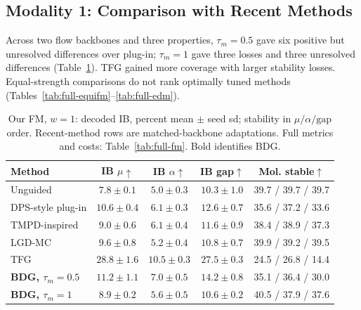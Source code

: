 \documentclass{article}
\begin{document}
\subsection{Modality 1: Comparison with Recent Methods}\label{sec:recent}
Across two flow backbones and three properties, $\tau_m=0.5$ gave six positive but unresolved differences over plug-in; $\tau_m=1$ gave three losses and three unresolved differences (Table~\ref{tab:recent}). TFG gained more coverage with larger stability losses. Equal-strength comparisons do not rank optimally tuned methods (Tables~\ref{tab:full-equifm}--\ref{tab:full-edm}).
\begin{table}[!htbp]
\centering\small
\caption{Our FM, $w=1$: decoded IB, percent mean $\pm$ seed sd; stability in $\mu/\alpha/\mathrm{gap}$ order. Recent-method rows are matched-backbone adaptations. Full metrics and costs: Table~\ref{tab:full-fm}. Bold identifies BDG.}
\label{tab:recent}
\begin{tabular}{lcccc}
\toprule
Method & IB $\mu\uparrow$ & IB $\alpha\uparrow$ & IB gap$\uparrow$ & Mol. stable$\uparrow$\\
\midrule
Unguided & $7.8\pm0.1$ & $5.0\pm0.3$ & $10.3\pm1.0$ & 39.7 / 39.7 / 39.7\\
DPS-style plug-in & $10.6\pm0.4$ & $6.1\pm0.3$ & $12.6\pm0.7$ & 35.6 / 37.2 / 33.6\\
TMPD-inspired & $9.0\pm0.6$ & $6.1\pm0.4$ & $11.6\pm0.9$ & 38.4 / 38.9 / 37.3\\
LGD-MC & $9.6\pm0.8$ & $5.2\pm0.4$ & $10.8\pm0.7$ & 39.9 / 39.2 / 39.5\\
TFG & $28.8\pm1.6$ & $10.5\pm0.3$ & $27.5\pm0.3$ & 24.5 / 26.8 / 14.4\\
\textbf{BDG, $\tau_m=0.5$} & $11.2\pm1.1$ & $7.0\pm0.5$ & $14.2\pm0.8$ & 35.1 / 36.4 / 30.0\\
\textbf{BDG, $\tau_m=1$} & $8.9\pm0.2$ & $5.6\pm0.5$ & $10.6\pm0.2$ & 40.5 / 37.9 / 37.6\\
\bottomrule
\end{tabular}
\end{table}
\end{document}
